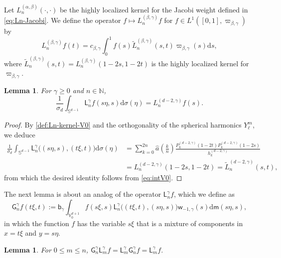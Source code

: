 \documentclass{amsart}
\newtheorem{lem}[thm]{Lemma}
\theoremstyle{remark}
\def\d{\mathrm{d}}
\def\sph{{\mathbb{S}^{d-1}}}
\def\a{{\alpha}}
\def\b{{\beta}}
\def\g{{\gamma}}
\def\s{\sigma}
\def\NN{{\mathbb N}}
\def\VV{{\mathbb V}}
\def\d{\mathrm{d}}
\def\sph{{\mathbb{S}^{d-1}}}
\def\sG{{\mathsf G}}
\def\sL{{\mathsf L}}
\def\sb{{\mathsf b}}
\def\sm{{\mathsf m}}
\def\sw{{\mathsf w}}
\def\a{{\alpha}}
\def\b{{\beta}}
\def\g{{\gamma}}
\def\s{\sigma}
\def\NN{{\mathbb N}}
\def\VV{{\mathbb V}}
\newcommand{\wt}{\widetilde}
\newcommand{\wh}{\widehat}
\begin{document}
Let $L_n^{(\a,\b)}(\cdot,\cdot)$ be the highly localized kernel for the Jacobi weight defined in \eqref{eq:Ln-Jacobi}. 
We define the operator $ f \mapsto L_n^{(\b,\g)} f$ for $f\in L^1([0,1], \varpi_{\b,\g})$ by
$$
       L_n^{(\b,\g)} f(t) = c_{\b,\g} \int_0^1 f(s) \wt L_n^{(\b,\g)}(s,t) \varpi_{\b,\g}(s)\d s,
$$
where $\wt L_n^{(\b,\g)}(s,t) = L_n^{(\b,\g)}(1-2s, 1-2 t)$ is the highly localized kernel for $\varpi_{\b,\g}$. 

\begin{lem} \label{lem:LnSph=}
For $\g \ge 0$ and $n\in \NN$, 
$$
  \frac{1}{\s_d} \int_{\sph} \sL_n^\g  f (s\eta,s) \d \s(\eta) =  L_n^{(d-2,\g)} f(s).
$$ 
\end{lem}

\begin{proof}
By \eqref{def:Ln-kernel-V0} and the orthogonality of the spherical harmonics $Y_\ell^m$, we deduce
\begin{align*}
 \frac{1}{\s_d} \int_{\sph} \sL_n^\g \big((s\eta,s),(t\xi ,t)\big) \d \s(\eta)
      & = \sum_{k=0}^{2n} \wh a \left(\frac{k}{n}\right) \frac{P_{k}^{(d-2,\g)} (1-2t)P_{k}^{(d-2,\g)} (1-2s)}{h_k^{(d-2,\g)}} \\
       & =  L_n^{(d-2,\g)}(1-2s, 1- 2 t) = \wt L_n^{(d-2,\g)}(s,t),
\end{align*}
from which the desired identity follows from \eqref{eq:intV0}.
\end{proof}
 
The next lemma is about an analog of the operator $\sL_n^\g f$, which we define as 
\begin{equation}\label{eq:GnF}
 \sG_n^\g f(t\xi,t):=\sb_\g
    \int_{\VV_0^{d+1}} f(s\xi,s) \sL_n^\gamma \big((t\xi,t),(s\eta,s)\big) \sw_{-1,\g}(s) \d \sm(s\eta, s),
\end{equation}
in which the function $f$ has the variable $s \xi$ that is a mixture of components in $x = t\xi$ and $ y = s\eta$. 

\begin{lem} \label{lem:L_nG}
For $0 \le m \le n$, $\sG_n^\g  \sL_m^\g f = \sL_m^\g \sG_n^\g f  = \sL_m^\g f$. 
\end{lem}
\end{document}
